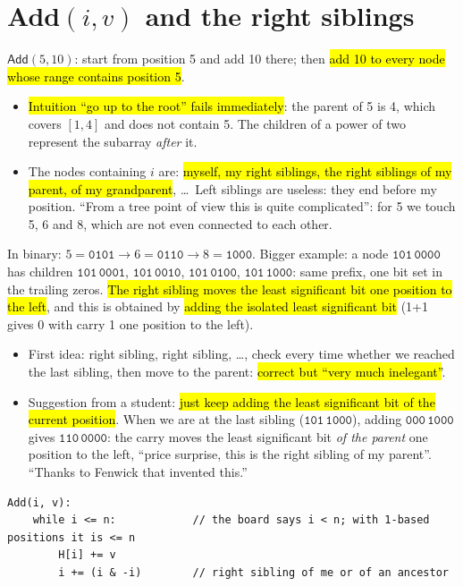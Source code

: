 \documentclass[11pt,a4paper]{article}
\theoremstyle{definition}\newtheorem*{definition}{Definition}
\newcommand{\hly}[1]{{\sethlcolor{hlY}\hl{#1}}}
\newcommand{\hlg}[1]{{\sethlcolor{hlG}\hl{#1}}}
\newcommand{\hlp}[1]{{\sethlcolor{hlP}\hl{#1}}}
\newcommand{\hlb}[1]{{\sethlcolor{hlB}\hl{#1}}}
\begin{document}
\section{\textsf{Add}$(i,v)$ and the right siblings}
$\textsf{Add}(5,10)$: start from position 5 and add 10 there; then \hly{add 10 to every node whose range contains position 5}.
\begin{itemize}[nosep]
\item \hlp{Intuition ``go up to the root'' fails immediately}: the parent of 5 is 4, which covers $[1,4]$ and does not contain 5. The children of a power of two
      represent the subarray \emph{after} it.
\item The nodes containing $i$ are: \hlb{myself, my right siblings, the right siblings of my parent, of my grandparent}, \dots\
      Left siblings are useless: they end before my position.
      ``From a tree point of view this is quite complicated'': for 5 we touch 5, 6 and 8, which are not even connected to each other.
\end{itemize}
In binary: $5=\texttt{0101}\to 6=\texttt{0110}\to 8=\texttt{1000}$. Bigger example: a node $\texttt{101}\,\texttt{0000}$ has children
$\texttt{101}\,\texttt{0001}$, $\texttt{101}\,\texttt{0010}$, $\texttt{101}\,\texttt{0100}$, $\texttt{101}\,\texttt{1000}$: same prefix, one bit set in the trailing zeros.
\hlb{The right sibling moves the least significant bit one position to the left}, and this is obtained by \hlb{adding the isolated least significant bit}
(1+1 gives 0 with carry 1 one position to the left).
\begin{itemize}[nosep]
\item First idea: right sibling, right sibling, \dots, check every time whether we reached the last sibling, then move to the parent: \hlp{correct but ``very much inelegant''}.
\item Suggestion from a student: \hlg{just keep adding the least significant bit of the current position}. When we are at the last sibling ($\texttt{101}\,\texttt{1000}$),
      adding $\texttt{000}\,\texttt{1000}$ gives $\texttt{110}\,\texttt{0000}$: the carry moves the least significant bit \emph{of the parent} one position to the left,
      ``price surprise, this is the right sibling of my parent''. ``Thanks to Fenwick that invented this.''
\end{itemize}
\begin{lstlisting}[language={},numbers=none]
Add(i, v):
    while i <= n:            // the board says i < n; with 1-based positions it is <= n
        H[i] += v
        i += (i & -i)        // right sibling of me or of an ancestor
\end{lstlisting}
\end{document}

